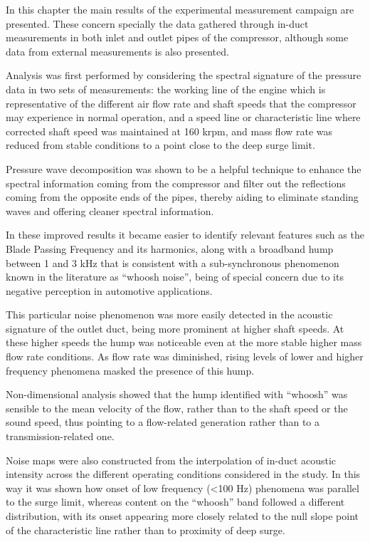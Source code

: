 In this chapter the main results of the experimental measurement campaign are presented. These concern specially the data gathered through in-duct measurements in both inlet and outlet pipes of the compressor, although some data from external measurements is also presented.

Analysis was first performed by considering the spectral signature of the pressure data in two sets of measurements: the working line of the engine which is representative of the different air flow rate and shaft speeds that the compressor may experience in normal operation, and a speed line or characteristic line where corrected shaft speed was maintained at 160 krpm, and mass flow rate was reduced from stable conditions to a point close to the deep surge limit.

Pressure wave decomposition was shown to be a helpful technique to enhance the spectral information coming from the compressor and filter out the reflections coming from the opposite ends of the pipes, thereby aiding to eliminate standing waves and offering  cleaner spectral information.

In these improved results it became easier to identify relevant features such as the Blade Passing Frequency and its harmonics, along with a broadband hump between 1 and 3 kHz that is consistent with a sub-synchronous phenomenon known in the literature as ``whoosh noise'', being of special concern due to its negative perception in automotive applications.

This particular noise phenomenon was more easily detected in the acoustic signature of the outlet duct, being more prominent at higher shaft speeds. At these higher speeds the hump was noticeable even at the more stable higher mass flow rate conditions. As flow rate was diminished, rising levels of lower and higher frequency phenomena masked the presence of this hump. 

Non-dimensional analysis showed that the hump identified with ``whoosh'' was sensible to the mean velocity of the flow, rather than to the shaft speed or the sound speed, thus pointing to a flow-related generation rather than to a transmission-related one.

Noise maps were also constructed from the interpolation of in-duct acoustic intensity across the different operating conditions considered in the study. In this way it was shown how onset of low frequency (<100 Hz) phenomena was parallel to the surge limit, whereas content on the ``whoosh'' band followed a different distribution, with its onset appearing more closely related to the null slope point of the characteristic line rather than to proximity of deep surge.

